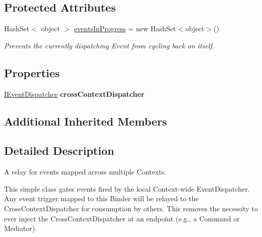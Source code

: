 \subsection*{Protected Attributes}
\begin{DoxyCompactItemize}
\item 
\hypertarget{classstrange_1_1extensions_1_1context_1_1impl_1_1_cross_context_bridge_a8ccc8f8fa78e4bd6fd2db7741f16feaf}{Hash\-Set$<$ object $>$ \hyperlink{classstrange_1_1extensions_1_1context_1_1impl_1_1_cross_context_bridge_a8ccc8f8fa78e4bd6fd2db7741f16feaf}{events\-In\-Progress} = new Hash\-Set$<$object$>$()}\label{classstrange_1_1extensions_1_1context_1_1impl_1_1_cross_context_bridge_a8ccc8f8fa78e4bd6fd2db7741f16feaf}

\begin{DoxyCompactList}\small\item\em Prevents the currently dispatching Event from cycling back on itself. \end{DoxyCompactList}\end{DoxyCompactItemize}
\subsection*{Properties}
\begin{DoxyCompactItemize}
\item 
\hypertarget{classstrange_1_1extensions_1_1context_1_1impl_1_1_cross_context_bridge_a8c9d156dc45e53c7d4b428ac6bf601c2}{\hyperlink{interfacestrange_1_1extensions_1_1dispatcher_1_1eventdispatcher_1_1api_1_1_i_event_dispatcher}{I\-Event\-Dispatcher} {\bfseries cross\-Context\-Dispatcher}}\label{classstrange_1_1extensions_1_1context_1_1impl_1_1_cross_context_bridge_a8c9d156dc45e53c7d4b428ac6bf601c2}

\end{DoxyCompactItemize}
\subsection*{Additional Inherited Members}


\subsection{Detailed Description}
A relay for events mapped across multiple Contexts. 

This simple class gates events fired by the local Context-\/wide Event\-Dispatcher. Any event trigger mapped to this Binder will be relayed to the Cross\-Context\-Dispatcher for consumption by others. This removes the necessity to ever inject the Cross\-Context\-Dispatcher at an endpoint (e.\-g., a Command or Mediator).

